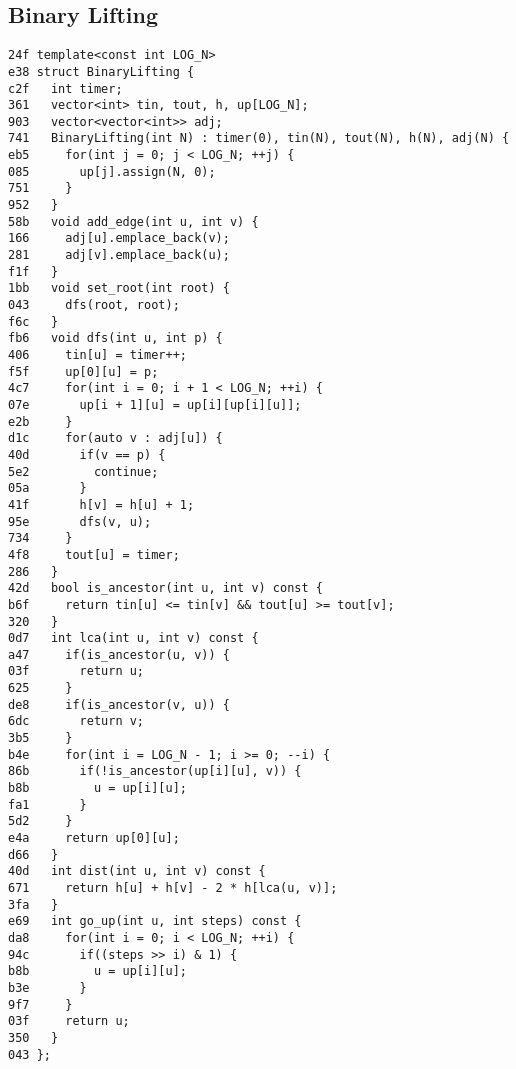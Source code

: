 \documentclass[10pt, a4paper, twoside]{article}
\begin{document}
\subsection{Binary Lifting}
\begin{lstlisting}
24f template<const int LOG_N>
e38 struct BinaryLifting {
c2f   int timer;
361   vector<int> tin, tout, h, up[LOG_N];
903   vector<vector<int>> adj;
741   BinaryLifting(int N) : timer(0), tin(N), tout(N), h(N), adj(N) {
eb5     for(int j = 0; j < LOG_N; ++j) {
085       up[j].assign(N, 0);
751     }
952   }
58b   void add_edge(int u, int v) {
166     adj[u].emplace_back(v);
281     adj[v].emplace_back(u);
f1f   }
1bb   void set_root(int root) {
043     dfs(root, root);
f6c   }
fb6   void dfs(int u, int p) {
406     tin[u] = timer++;
f5f     up[0][u] = p;
4c7     for(int i = 0; i + 1 < LOG_N; ++i) {
07e       up[i + 1][u] = up[i][up[i][u]];
e2b     }
d1c     for(auto v : adj[u]) {
40d       if(v == p) {
5e2         continue;
05a       }
41f       h[v] = h[u] + 1;
95e       dfs(v, u);
734     }
4f8     tout[u] = timer;
286   }
42d   bool is_ancestor(int u, int v) const {
b6f     return tin[u] <= tin[v] && tout[u] >= tout[v];
320   }
0d7   int lca(int u, int v) const {
a47     if(is_ancestor(u, v)) {
03f       return u;
625     }
de8     if(is_ancestor(v, u)) {
6dc       return v;
3b5     }
b4e     for(int i = LOG_N - 1; i >= 0; --i) {
86b       if(!is_ancestor(up[i][u], v)) {
b8b         u = up[i][u];
fa1       }
5d2     }
e4a     return up[0][u];
d66   }
40d   int dist(int u, int v) const {
671     return h[u] + h[v] - 2 * h[lca(u, v)];
3fa   }
e69   int go_up(int u, int steps) const {
da8     for(int i = 0; i < LOG_N; ++i) {
94c       if((steps >> i) & 1) {
b8b         u = up[i][u];
b3e       }
9f7     }
03f     return u;
350   }
043 };
\end{lstlisting}
\end{document}
